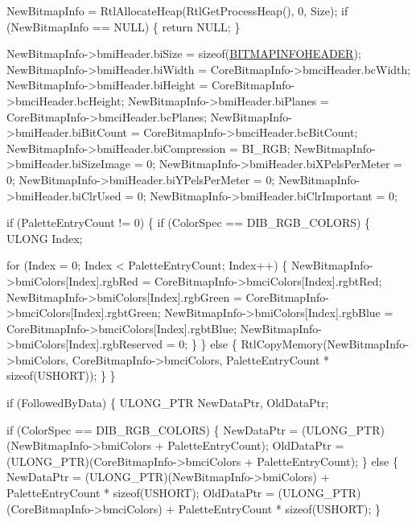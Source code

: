 \begin{DoxyCodeInclude}
        NewBitmapInfo = RtlAllocateHeap(RtlGetProcessHeap(), 0, Size);
        \textcolor{keywordflow}{if} (NewBitmapInfo == NULL)
        \{
            \textcolor{keywordflow}{return} NULL;
        \}

        NewBitmapInfo->bmiHeader.biSize = \textcolor{keyword}{sizeof}(\hyperlink{struct_b_i_t_m_a_p_i_n_f_o_h_e_a_d_e_r}{BITMAPINFOHEADER});
        NewBitmapInfo->bmiHeader.biWidth = CoreBitmapInfo->bmciHeader.bcWidth;
        NewBitmapInfo->bmiHeader.biHeight = CoreBitmapInfo->bmciHeader.bcHeight;
        NewBitmapInfo->bmiHeader.biPlanes = CoreBitmapInfo->bmciHeader.bcPlanes;
        NewBitmapInfo->bmiHeader.biBitCount = CoreBitmapInfo->bmciHeader.bcBitCount;
        NewBitmapInfo->bmiHeader.biCompression = BI\_RGB;
        NewBitmapInfo->bmiHeader.biSizeImage = 0;
        NewBitmapInfo->bmiHeader.biXPelsPerMeter = 0;
        NewBitmapInfo->bmiHeader.biYPelsPerMeter = 0;
        NewBitmapInfo->bmiHeader.biClrUsed = 0;
        NewBitmapInfo->bmiHeader.biClrImportant = 0;

        \textcolor{keywordflow}{if} (PaletteEntryCount != 0)
        \{
            \textcolor{keywordflow}{if} (ColorSpec == DIB\_RGB\_COLORS)
            \{
                ULONG Index;

                \textcolor{keywordflow}{for} (Index = 0; Index < PaletteEntryCount; Index++)
                \{
                    NewBitmapInfo->bmiColors[Index].rgbRed =
                        CoreBitmapInfo->bmciColors[Index].rgbtRed;
                    NewBitmapInfo->bmiColors[Index].rgbGreen =
                        CoreBitmapInfo->bmciColors[Index].rgbtGreen;
                    NewBitmapInfo->bmiColors[Index].rgbBlue =
                        CoreBitmapInfo->bmciColors[Index].rgbtBlue;
                    NewBitmapInfo->bmiColors[Index].rgbReserved = 0;
                \}
            \}
            \textcolor{keywordflow}{else}
            \{
                RtlCopyMemory(NewBitmapInfo->bmiColors,
                              CoreBitmapInfo->bmciColors,
                              PaletteEntryCount * \textcolor{keyword}{sizeof}(USHORT));
            \}
        \}

        \textcolor{keywordflow}{if} (FollowedByData)
        \{
            ULONG\_PTR NewDataPtr, OldDataPtr;

            \textcolor{keywordflow}{if} (ColorSpec == DIB\_RGB\_COLORS)
            \{
                NewDataPtr = (ULONG\_PTR)(NewBitmapInfo->bmiColors +
                                         PaletteEntryCount);
                OldDataPtr = (ULONG\_PTR)(CoreBitmapInfo->bmciColors +
                                         PaletteEntryCount);
            \}
            \textcolor{keywordflow}{else}
            \{
                NewDataPtr = (ULONG\_PTR)(NewBitmapInfo->bmiColors) +
                             PaletteEntryCount * \textcolor{keyword}{sizeof}(USHORT);
                OldDataPtr = (ULONG\_PTR)(CoreBitmapInfo->bmciColors) +
                             PaletteEntryCount * \textcolor{keyword}{sizeof}(USHORT);
            \}


\end{DoxyCodeInclude}
